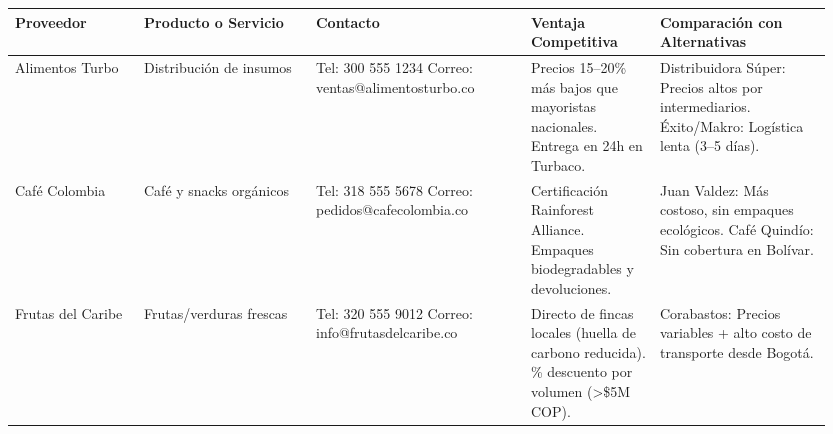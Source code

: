 \documentclass[letterpaper, 11pt]{report}
\begin{document}
\begin{longtable}{|p{0.15\linewidth}|p{0.20\linewidth}|p{0.25\linewidth}|p{0.15\linewidth}|p{0.20\linewidth}|}
      \hline
      \textbf{Proveedor}                                                                                                      & \textbf{Producto o Servicio} & \textbf{Contacto}                                                                                      & \textbf{Ventaja Competitiva} & \textbf{Comparación con Alternativas} \\
      \hline
      Alimentos Turbo                                                                                                         & Distribución de insumos      & Tel: 300 555 1234 \hfil \break Correo: ventas@alimentosturbo.co                                        &
      Precios 15--20\% más bajos que mayoristas nacionales. \hfil \break Entrega en 24h en Turbaco.                           &
      Distribuidora Súper: Precios altos por intermediarios. \hfil \break Éxito/Makro: Logística lenta (3--5 días).                                                                                                                                                                                                                          \\
      \hline
      Café Colombia                                                                                                           & Café y snacks orgánicos      & Tel: 318 555 5678 \hfil \break Correo: pedidos@cafecolombia.co                                         &
      Certificación Rainforest Alliance. \hfil \break Empaques biodegradables y devoluciones.                                 &
      Juan Valdez: Más costoso, sin empaques ecológicos. \hfil \break Café Quindío: Sin cobertura en Bolívar.                                                                                                                                                                                                                                \\
      \hline
      Frutas del Caribe                                                                                                       & Frutas/verduras frescas      & Tel: 320 555 9012 \hfil \break Correo: info@frutasdelcaribe.co                                         &
      Directo de fincas locales (huella de carbono reducida). \hfil \break 10\% descuento por volumen (\textgreater\$5M COP). &
      Corabastos: Precios variables + alto costo de transporte desde Bogotá.                                                                                                                                                                                                                                                                 \\

\end{longtable}
\end{document}
